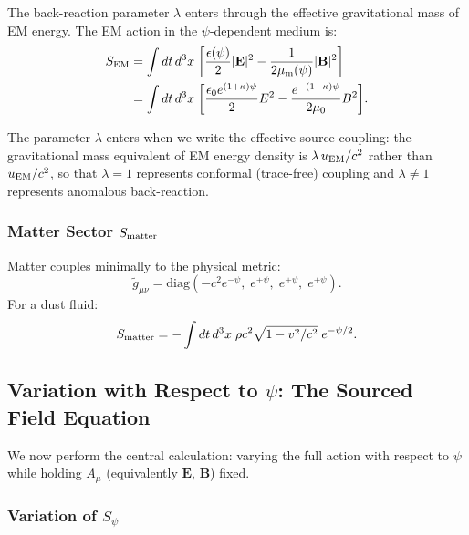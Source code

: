 \documentclass[aps,prd,twocolumn,superscriptaddress,floatfix,nofootinbib]{revtex4-2}
\newcommand{\kap}{\kappa}
\begin{document}
The back-reaction parameter $\lambda$ enters through the effective
gravitational mass of EM energy. The EM action in the $\psi$-dependent
medium is:
\begin{align}
S_{\rm EM} &= \int dt\,d^3x\;\biggl[
  \frac{\epsilon(\psi)}{2}|\mathbf{E}|^2
  - \frac{1}{2\mu_{\rm m}(\psi)}|\mathbf{B}|^2
\biggr] \notag\\
&= \int dt\,d^3x\;\biggl[
  \frac{\epsilon_0 e^{(1+\kap)\psi}}{2}E^2
  - \frac{e^{-(1-\kap)\psi}}{2\mu_0}B^2
\biggr].
\label{eq:S-EM}
\end{align}

The parameter $\lambda$ enters when we write the effective source
coupling: the gravitational mass equivalent of EM energy density is
$\lambda\,u_{\rm EM}/c^2$ rather than $u_{\rm EM}/c^2$, so that
$\lambda = 1$ represents conformal (trace-free) coupling and
$\lambda \neq 1$ represents anomalous back-reaction.

\subsubsection{Matter Sector $S_{\rm matter}$}

Matter couples minimally to the physical metric:
\begin{equation}
\tilde{g}_{\mu\nu} = \text{diag}\!\left(-c^2 e^{-\psi},\;
e^{+\psi},\; e^{+\psi},\; e^{+\psi}\right).
\end{equation}
For a dust fluid:
\begin{equation}
S_{\rm matter} = -\int dt\,d^3x\;\rho c^2\sqrt{1 - v^2/c^2}\;
e^{-\psi/2}.
\end{equation}

\subsection{Variation with Respect to $\psi$: The Sourced Field
Equation}\label{sec:var-psi}

We now perform the central calculation: varying the full action with
respect to $\psi$ while holding $A_\mu$ (equivalently $\mathbf{E}$,
$\mathbf{B}$) fixed.

\subsubsection{Variation of $S_\psi$}
\end{document}
